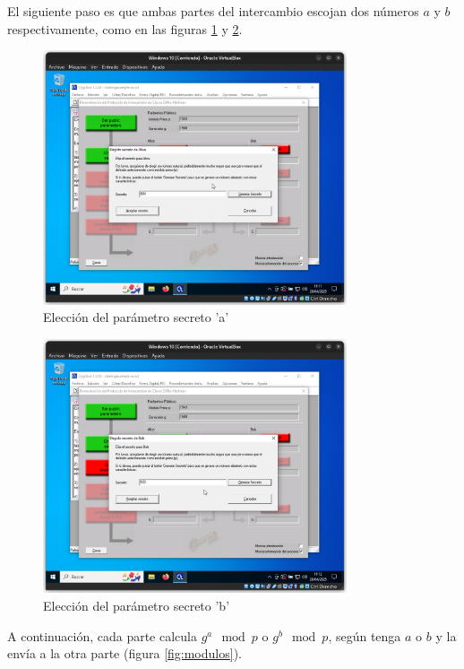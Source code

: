 El siguiente paso es que ambas partes del intercambio escojan dos números $a$ y $b$ respectivamente, como en las figuras \ref{fig:aparam} y \ref{fig:bparam}.

\begin{figure}[H]
    \centering
    \includegraphics[width=0.8\textwidth]{D&H-3.png}
    \caption{Elección del parámetro secreto 'a'}
    \label{fig:aparam}
\end{figure}

\begin{figure}[H]
    \centering
    \includegraphics[width=0.8\textwidth]{D&H-4.png}
    \caption{Elección del parámetro secreto 'b'}
    \label{fig:bparam}
\end{figure}

A continuación, cada parte calcula $g^a\mod{p}$ o $g^b\mod{p}$, según tenga $a$ o $b$ y la envía a la otra parte (figura \ref{fig:modulos}).

